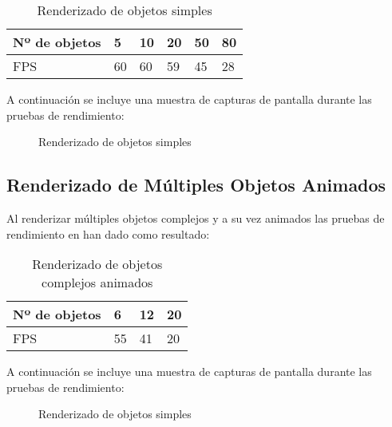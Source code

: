 \begin{table}[h!]
\centering
\begin{tabular}{|l|l|l|l|l|l|}
\hline
Nº de objetos & 5  & 10 & 20 & 50 & 80 \\ \hline
FPS           & 60 & 60 & 59 & 45 & 28 \\ \hline
\end{tabular}
\caption[Renderizado de objetos simples]{Renderizado de objetos simples}
\label{ll:rendersimple}
\end{table}

A continuación se incluye una muestra de capturas de pantalla durante las pruebas de rendimiento:\\

\begin{figure}[h!]
\centering
{}
\hspace{0mm}
\hspace{0mm}
\caption[Renderizado de objetos simples]{Renderizado de objetos simples}
\label{fig:benchmarksimple}
\end{figure}

\subsection{Renderizado de Múltiples Objetos Animados}
Al renderizar múltiples objetos complejos y a su vez animados las pruebas de rendimiento en \robotto han dado como resultado:\\

\begin{table}[h!]
\centering
\begin{tabular}{|l|l|l|l|}
\hline
Nº de objetos & 6  & 12 & 20 \\ \hline
FPS           & 55 & 41 & 20 \\ \hline
\end{tabular}
\caption[Renderizado de objetos complejos animados]{Renderizado de objetos complejos animados}
\label{ll:renderanim}
\end{table}

A continuación se incluye una muestra de capturas de pantalla durante las pruebas de rendimiento:\\

\begin{figure}[h!]
\centering
{}
\hspace{0mm}
\caption[Renderizado de objetos simples]{Renderizado de objetos simples}
\label{fig:benchmarksimple}
\end{figure}